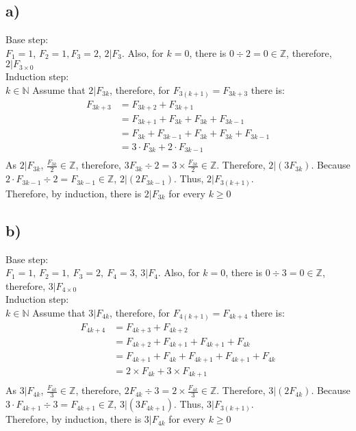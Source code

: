 \documentclass{article}
\begin{document}
    \subsection*{a)}
        Base step:\\
        \(F_1=1\), \(F_2=1, F_3=2\), \(2|F_3\). Also, for \(k=0\), there is \(0\div 2 =0\in \mathbb{Z}\), therefore, \(2|F_{3\times 0}\)\\
        Induction step:\\
        \(k\in \mathbb{N}\) Assume that \(2|F_{3k}\), therefore, for \(F_{3(k+1)}=F_{3k+3}\) there is:
        \begin{align*}
            F_{3k+3}&=F_{3k+2}+F_{3k+1}\\
                    &=F_{3k+1}+F_{3k}+F_{3k}+F_{3k-1}\\
                    &=F_{3k}+F_{3k-1}+F_{3k}+F_{3k}+F_{3k-1}\\
                    &=3\cdot F_{3k}+2\cdot F_{3k-1}\\
        \end{align*}
        As \(2|F_{3k}\), \(\displaystyle{\frac{F_{3k}}{2}\in \mathbb{Z}}\), therefore, \(3F_{3k} \div 2=3\times \frac{F_{3k}}{2}\in \mathbb{Z}\).
        Therefore, \(2|(3 F_{3k})\). Because \(2\cdot F_{3k-1} \div 2 = F_{3k-1}\in \mathbb{Z}\), \(2|(2 F_{3k-1})\).
        Thus, \(2|F_{3(k+1)}\).\\Therefore, by induction, there is \(2|F_{3k}\) for every \(k\geqslant 0\)
    \subsection*{b)}
    Base step:\\
        \(F_1=1\), \(F_2=1,\  F_3=2,\ F_4=3\), \(3|F_4\). Also, for \(k=0\), there is \(0\div 3 =0\in \mathbb{Z}\), therefore, \(3|F_{4\times 0}\)\\
        Induction step:\\
        \(k\in \mathbb{N}\) Assume that \(3|F_{4k}\), therefore, for \(F_{4(k+1)}=F_{4k+4}\) there is:\\
        \begin{align*}
            F_{4k+4}&=F_{4k+3}+F_{4k+2}\\
                    &=F_{4k+2}+F_{4k+1}+F_{4k+1}+F_{4k}\\
                    &=F_{4k+1}+F_{4k}+F_{4k+1}+F_{4k+1}+F_{4k}\\
                    &=2\times F_{4k}+3\times F_{4k+1}\\
        \end{align*}
        As \(3|F_{4k}\), \(\displaystyle{\frac{F_{4k}}{3}\in \mathbb{Z}}\), therefore, \(2F_{4k} \div 3=2\times \frac{F_{4k}}{3}\in \mathbb{Z}\).
        Therefore, \(3|(2 F_{4k})\). Because \(3\cdot F_{4k+1} \div 3 = F_{4k+1}\in \mathbb{Z}\), \(3|(3 F_{4k+1})\).
        Thus, \(3|F_{3(k+1)}\).\\Therefore, by induction, there is \(3|F_{4k}\) for every \(k\geqslant 0\)
        
\end{document}
